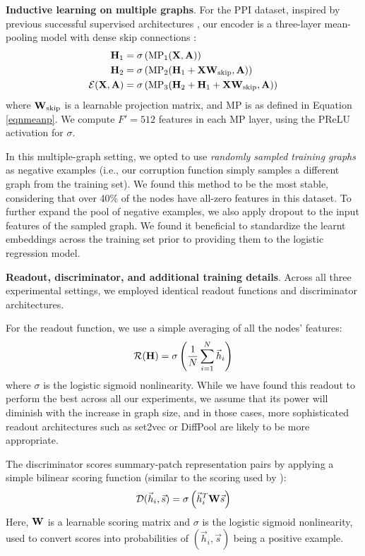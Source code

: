 \documentclass{article} \usepackage{iclr2019_conference,times}
\newcommand{\xhdr}[1]{{\noindent\bfseries #1}.}
\begin{document}
\xhdr{Inductive learning on multiple graphs} 
For the PPI dataset, inspired by previous successful supervised architectures \citep{velickovic2018graph}, our encoder is a three-layer mean-pooling model with dense skip connections \citep{he2016deep,huang2017densely}:
\begin{align}
	{\bf H}_1 &= \sigma\left(\text{MP}_1({\bf X}, {\bf A})\right)\\
	{\bf H}_2 &= \sigma\left(\text{MP}_2({\bf H}_1 + {\bf X}{\bf W}_{\text{skip}}, {\bf A})\right)\\
	\mathcal{E}({\bf X}, {\bf A}) &= \sigma\left(\text{MP}_3({\bf H}_2 + {\bf H}_1 + {\bf X}{\bf W}_{\text{skip}}, {\bf A})\right)
\end{align} 
where ${\bf W}_{\text{skip}}$ is a learnable projection matrix, and $\text{MP}$ is as defined in Equation \ref{eqnmeanp}. We compute $F' = 512$ features in each MP layer, using the PReLU activation for $\sigma$.

In this multiple-graph setting, we opted to use \emph{randomly sampled training graphs} as negative examples (i.e., our corruption function simply samples a different graph from the training set). We found this method to be the most stable, considering that over 40\% of the nodes have all-zero features in this dataset. To further expand the pool of negative examples, we also apply dropout \citep{srivastava2014dropout} to the input features of the sampled graph. We found it beneficial to standardize the learnt embeddings across the training set prior to providing them to the logistic regression model.

\xhdr{Readout, discriminator, and additional training details}
Across all three experimental settings, we employed identical readout functions and discriminator architectures. 

For the readout function, we use a simple averaging of all the nodes' features:
\begin{equation}
	\mathcal{R}({\bf H}) = \sigma\left(\frac{1}{N}\sum_{i=1}^N \vec{h}_i	\right)
\end{equation}
where $\sigma$ is the logistic sigmoid nonlinearity. While we have found this readout to perform the best across all our experiments, we assume that its power will diminish with the increase in graph size, and in those cases, more sophisticated readout architectures such as set2vec \citep{vinyals2015order} or DiffPool \citep{ying2018hierarchical} are likely to be more appropriate.

The discriminator scores summary-patch representation pairs by applying a simple bilinear scoring function (similar to the scoring used by \cite{oord2018representation}):
\begin{equation}
	\mathcal{D}(\vec{h}_i, \vec{s}) = \sigma\left(\vec{h}_i^T{\bf W}\vec{s}\right)
\end{equation}
Here, ${\bf W}$ is a learnable scoring matrix and $\sigma$ is the logistic sigmoid nonlinearity, used to convert scores into probabilities of $(\vec{h}_i, \vec{s})$ being a positive example.
\end{document}
